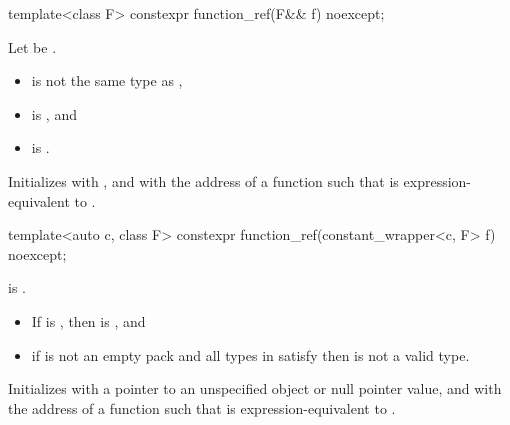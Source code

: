 %
\begin{itemdecl}
template<class F> constexpr function_ref(F&& f) noexcept;
\end{itemdecl}

\begin{itemdescr}
\pnum
Let  be .

\pnum
\constraints
\begin{itemize}
\item {} is not the same type as ,
\item {} is , and
\item {} is .
\end{itemize}

\pnum
\effects
Initializes
 with , and
 with the address of a function 
such that
is expression-equivalent to
.
\end{itemdescr}

%
\begin{itemdecl}
template<auto c, class F> constexpr function_ref(constant_wrapper<c, F> f) noexcept;
\end{itemdecl}

\begin{itemdescr}
\pnum
\constraints
{} is .

\pnum
\mandates
\begin{itemize}
\item
If  is ,
then  is , and
\item
if  is not an empty pack and
all types in  satisfy 
then 
is not a valid type.
\end{itemize}

\pnum
\effects
Initializes
 with a pointer to an unspecified object or
null pointer value, and
 with the address of a function 
such that
is expression-equivalent to
.
\end{itemdescr}

